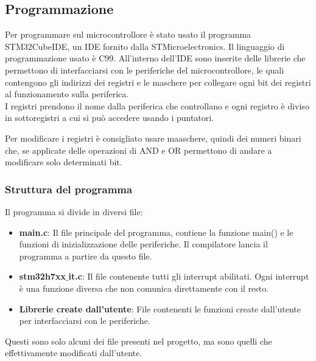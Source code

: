 \pagebreak

\subsection{Programmazione}
Per programmare sul microcontrollore è stato usato il programma STM32CubeIDE, un IDE fornito dalla STMicroelectronics. Il linguaggio di programmazione usato è C99. All'interno dell'IDE sono inserite delle librerie che permettono di interfacciarsi con le periferiche del microcontrollore, le quali contengono gli indirizzi dei registri e le maschere per collegare ogni bit dei registri al funzionamento sulla periferica.\\

I registri prendono il nome dalla periferica che controllano e ogni registro è diviso in sottoregistri a cui si può accedere usando i puntatori.

Per modificare i registri è consigliato usare maaschere, quindi dei numeri binari che, se applicate delle operazioni di AND e OR permettono di andare a modificare solo determinati bit.

\subsubsection{Struttura del programma}
Il programma si divide in diversi file:
\begin{itemize}
    \item \textbf{main.c}: Il file principale del programma, contiene la funzione main() e le funzioni di inizializzazione delle periferiche. Il compilatore lancia il programma a partire da questo file.
    \item \textbf{stm32h7xx$\_$it.c}: Il file contenente tutti gli interrupt abilitati. Ogni interrupt è una funzione diversa che non comunica direttamente con il resto.
    \item \textbf{Librerie create dall'utente}: File contenenti le funzioni create dall'utente per interfacciarsi con le periferiche.
\end{itemize}

Questi sono solo alcuni dei file presenti nel progetto, ma sono quelli che effettivamente modificati dall'utente.



